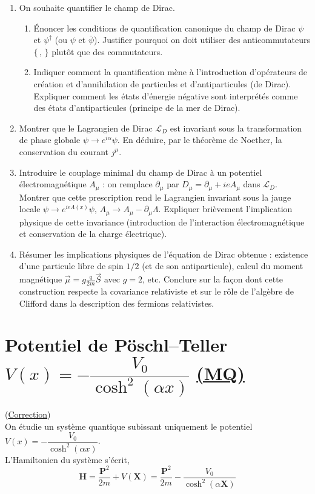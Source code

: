 \documentclass[a4paper,10pt]{report}
\begin{document}
\begin{enumerate}
	\item On souhaite quantifier le champ de Dirac. 
	\begin{enumerate}
		\item Énoncer les conditions de quantification canonique du champ de Dirac $\psi$ et $\psi^\dagger$ (ou $\psi$ et $\bar\psi$). Justifier pourquoi on doit utiliser des anticommutateurs $\{\,,\,\}$ plutôt que des commutateurs. 
		\item Indiquer comment la quantification mène à l’introduction d’opérateurs de création et d’annihilation de particules et d’antiparticules (de Dirac). Expliquer comment les états d’énergie négative sont interprétés comme des états d’antiparticules (principe de la mer de Dirac).
	\end{enumerate}
	
	\item Montrer que le Lagrangien de Dirac $\mathcal{L}_D$ est invariant sous la transformation de phase globale $\psi \to e^{i\alpha}\psi$. En déduire, par le théorème de Noether, la conservation du courant $j^\mu$. 
	
	\item Introduire le couplage minimal du champ de Dirac à un potentiel électromagnétique $A_\mu$ : on remplace $\partial_\mu$ par $D_\mu = \partial_\mu + i e A_\mu$ dans $\mathcal{L}_D$. Montrer que cette prescription rend le Lagrangien invariant sous la jauge locale $\psi \to e^{i e\Lambda(x)}\psi$, $A_\mu \to A_\mu - \partial_\mu \Lambda$. Expliquer brièvement l'implication physique de cette invariance (introduction de l'interaction électromagnétique et conservation de la charge électrique).
	
	\item Résumer les implications physiques de l'équation de Dirac obtenue : existence d'une particule libre de spin $1/2$ (et de son antiparticule), calcul du moment magnétique $\vec\mu= g\frac{q}{2m}\vec S$ avec $g=2$, etc. Conclure sur la façon dont cette construction respecte la covariance relativiste et sur le rôle de l'algèbre de Clifford dans la description des fermions relativistes.
\end{enumerate}

\newpage \section[Potentiel de Pöschl--Teller $V(x) = -\dfrac{V_0}{\cosh^2(\alpha x)}$ $\triangle$]{Potentiel de Pöschl--Teller $V(x) = -\dfrac{V_0}{\cosh^2(\alpha x)}$ \hyperref[subsubsec:quantique]{(MQ)}\space \faStar\faStar\faStar}\label{subsec:Potentiel}
(\hyperref[subsec:correctionPotentiel]{Correction})
\\
On étudie un système quantique subissant uniquement le potentiel $V(x) = -\dfrac{V_0}{\cosh^2(\alpha x)}$.\\
L'Hamiltonien du système s'écrit,
$$\textbf{H} = \frac{\textbf{P}^2}{2m} + V(\textbf{X}) = \frac{\textbf{P}^2}{2m}-\dfrac{V_0}{\cosh^2(\alpha\textbf{X})} $$
\end{document}
